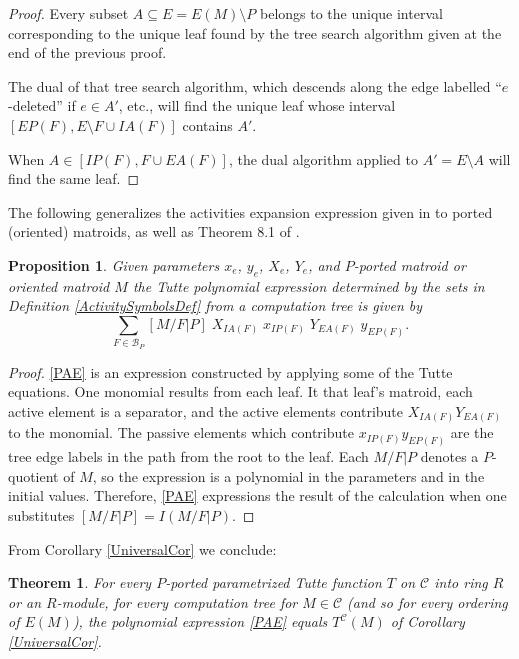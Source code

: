 \documentclass[12pt,leqno]{amsart}
\newtheorem{prop}[lem]{Proposition}
\newtheorem{thm}[lem]{Theorem}
\theoremstyle{remark}
\begin{document}
\begin{proof}
Every subset $A\subseteq E=E(M)\setminus P$ belongs to the
unique interval corresponding to the unique leaf found by the tree search 
algorithm given at the end of the previous proof.  

The dual of that tree search algorithm, which descends along
the edge labelled ``$e$-deleted'' if $e\in A'$, etc., will find the
unique leaf whose interval $[EP(F),E\setminus F\cup IA(F)]$ contains
$A'$.

When $A\in[IP(F),F\cup EA(F)]$, the dual algorithm applied to
$A'=E\setminus A$ will find the same leaf.
\end{proof}


The following generalizes the activities expansion expression given
in \cite{MR93a:05047} to ported (oriented) matroids, as well as 
Theorem 8.1 of \cite{SetPointedLV}. 

\begin{prop}
\label{TuttePolyExpression}
Given parameters $x_e$, $y_e$, $X_e$, $Y_e$, and 
$P$-ported matroid or oriented matroid $M$
the Tutte polynomial expression
determined by the sets in Definition 
\ref{ActivitySymbolsDef} 
from a computation tree is 
given by
\begin{equation}
\tag{PAE}
\label{PAE}
\sum_{F\in \mathcal{B}_P}[M/F|P]
\;X_{IA(F)}\;x_{IP(F)}\;Y_{EA(F)}\;y_{EP(F)}.
\end{equation}
\end{prop}

\begin{proof}
\eqref{PAE} is an expression constructed by applying some of the
Tutte equations.  One monomial results from each leaf.
It that leaf's matroid,
each active element is a separator, and the active elements
contribute $X_{IA(F)}Y_{EA(F)}$ to the monomial.
The passive elements which contribute
$x_{IP(F)}y_{EP(F)}$
are the tree
edge labels in the path from the root to the leaf.
Each $M/F|P$ denotes a $P$-quotient of $M$, so the
expression is a polynomial in the parameters and in the
initial values.  
Therefore, \eqref{PAE} expressions the result of
the calculation when one substitutes
$[M/F|P]=I(M/F|P)$.
\end{proof}

From Corollary \ref{UniversalCor} we conclude:
\begin{thm}
\label{ActivitiesTheorem}
For every $P$-ported parametrized Tutte function $T$ 
on $\mathcal{C}$ into 
ring $R$ or an $R$-module,
for every computation tree for $M\in\mathcal{C}$
(and so for every ordering of $E(M)$), 
the polynomial expression \eqref{PAE} equals 
$T^{\mathcal{C}}(M)$ of Corollary \ref{UniversalCor}.
\end{thm}
\end{document}
